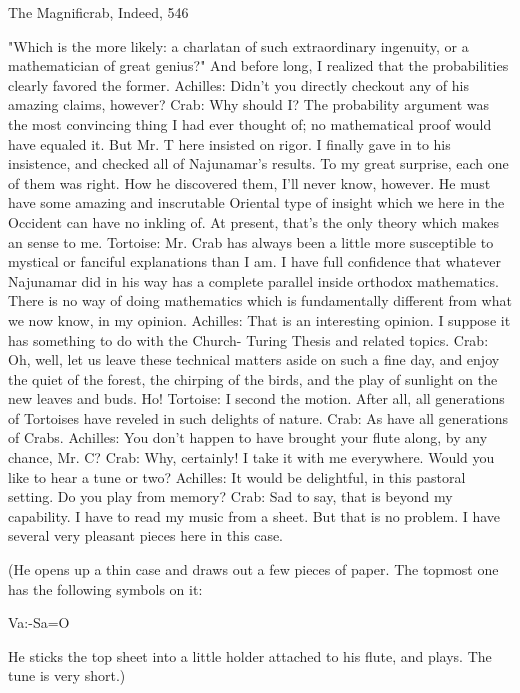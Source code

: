 {The Magnificrab, Indeed,                                                                  546

   "Which is the more likely: a charlatan of such extraordinary ingenuity, or a
   mathematician of great genius?" And before long, I realized that the probabilities clearly
   favored the former.
Achilles: Didn't you directly checkout any of his amazing claims, however?
Crab: Why should I? The probability argument was the most convincing thing I had ever
   thought of; no mathematical proof would have equaled it. But Mr. T here insisted on
   rigor. I finally gave in to his insistence, and checked all of Najunamar's results. To my
   great surprise, each one of them was right. How he discovered them, I'll never know,
   however. He must have some amazing and inscrutable Oriental type of insight which we
   here in the Occident can have no inkling of. At present, that's the only theory which
   makes an sense to me.
Tortoise: Mr. Crab has always been a little more susceptible to mystical or fanciful
   explanations than I am. I have full confidence that whatever Najunamar did in his way
   has a complete parallel inside orthodox mathematics. There is no way of doing
   mathematics which is fundamentally different from what we now know, in my opinion.
Achilles: That is an interesting opinion. I suppose it has something to do with the Church-
   Turing Thesis and related topics.
Crab: Oh, well, let us leave these technical matters aside on such a fine day, and enjoy the
   quiet of the forest, the chirping of the birds, and the play of sunlight on the new leaves
   and buds. Ho!
Tortoise: I second the motion. After all, all generations of Tortoises have reveled in such
   delights of nature.
Crab: As have all generations of Crabs.
Achilles: You don't happen to have brought your flute along, by any chance, Mr. C?
Crab: Why, certainly! I take it with me everywhere. Would you like to hear a tune or two?
Achilles: It would be delightful, in this pastoral setting. Do you play from memory?
Crab: Sad to say, that is beyond my capability. I have to read my music
from a sheet. But that is no problem. I have several very pleasant pieces here in this case.

  (He opens up a thin case and draws out a few pieces of paper. The topmost one has the
  following symbols on it:

                                          Va:-Sa=O

  He sticks the top sheet into a little holder attached to his flute, and plays. The tune is very
  short.)

}
